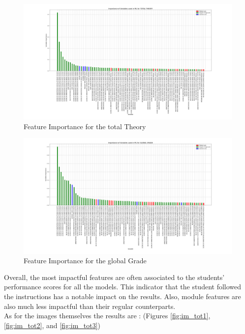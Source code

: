 \documentclass[a4paper,11pt]{report}
\numberwithin{figure}{section} %
\begin{document}
      \begin{figure}[H]
      \centering
      \includegraphics[width=.95\linewidth]{plots/var_importance_TOTAL_THEORY_2018-05-02_23_31_54.png}
      \caption{Feature Importance for the total Theory}
      \label{fig:var_tot2}
      \end{figure}
      
      \begin{figure}[H]
      \centering
      \includegraphics[width=.95\linewidth]{plots/var_importance_GLOBAL_GRADE_2018-05-02_20_56_11.png}
      \caption{Feature Importance for the global Grade}
      \label{fig:var_tot3}
      \end{figure}   

    Overall, the most impactful features are often associated to the students' performance scores for all the models.
    This indicator that the student followed the instructions has a notable impact on the results.
    Also, module features are also much less impactful than their regular counterparts.\\

    As for the images themselves the results are : (Figures \ref{fig:im_tot1}, \ref{fig:im_tot2}, and \ref{fig:im_tot3})
      
\end{document}
